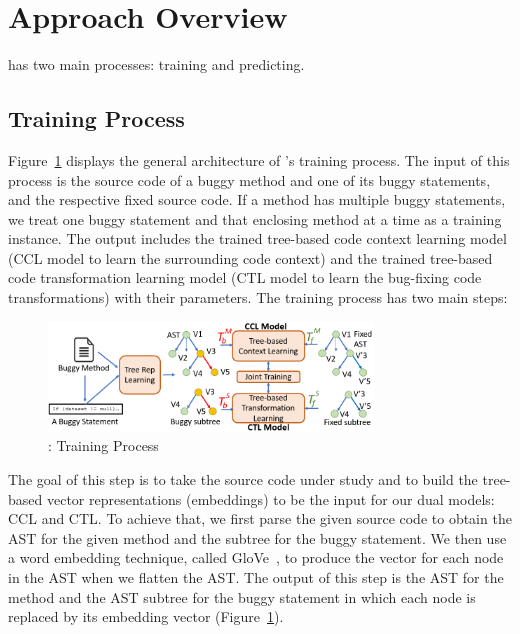 \section{Approach Overview}
\label{overview:sec}

{\tool} has two main processes: training and predicting.

\subsection{Training Process}

Figure~\ref{overview-training} displays the general architecture of
{\tool}'s training process. The input of this process is the
source code of a buggy method and one of its buggy statements, and the
respective fixed source code. 
If a method has multiple buggy
statements, we treat one buggy statement and that enclosing method at
a time as a training instance. The output includes the trained
tree-based code context learning model (CCL model to learn the
surrounding code context) and the trained tree-based code
transformation learning model (CTL model to learn the
bug-fixing code transformations) with their parameters. The training
process has two main steps:

\begin{figure}[t]
	\centering
	\includegraphics[width=3.4in]{graphs/new_overview.png}
        \vspace{-15pt}
	\caption{{\tool}: Training Process}
	\label{overview-training}
\end{figure}

\vspace{3pt}
 The goal of this
step is to take the source code under study and to build the
tree-based vector representations (embeddings) to be the input for our
dual models: CCL and CTL. To achieve that, we first parse the given
source code to obtain the AST for the given method and the subtree for
the buggy statement.  We then use a word embedding technique, called
GloVe~\cite{pennington2014glove}, to produce the vector for each node
in the AST when we flatten the AST. The output of this step is the AST
for the method and the AST subtree for the buggy statement in which
each node is replaced by its embedding vector
(Figure~\ref{overview-training}).

